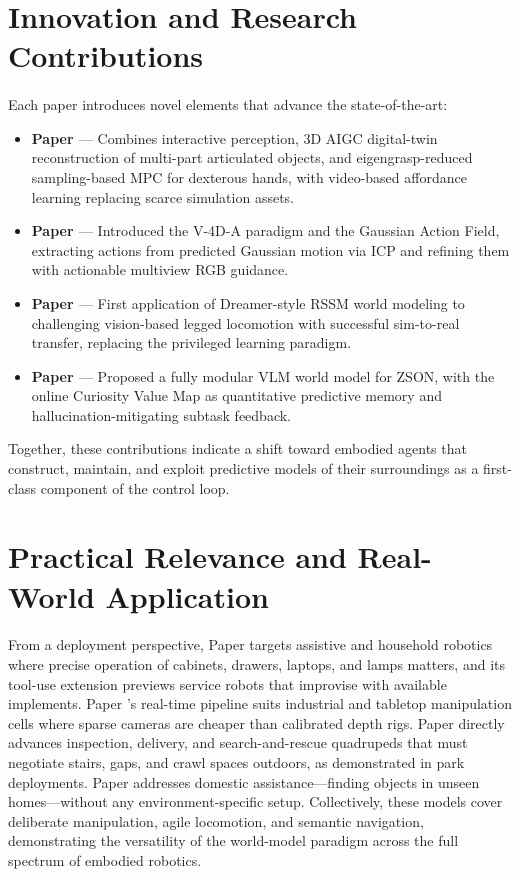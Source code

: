 \documentclass[12pt,a4paper,final]{extreport}
\begin{document}
\section{Innovation and Research Contributions}

\paragraph{} Each paper introduces novel elements that advance the state-of-the-art:
\begin{itemize}
  \item \textbf{Paper \cite{p1}} --- Combines interactive perception, 3D AIGC digital-twin reconstruction of multi-part articulated objects, and eigengrasp-reduced sampling-based MPC for dexterous hands, with video-based affordance learning replacing scarce simulation assets.
  \item \textbf{Paper \cite{p2}} --- Introduced the V-4D-A paradigm and the Gaussian Action Field, extracting actions from predicted Gaussian motion via ICP and refining them with actionable multiview RGB guidance.
  \item \textbf{Paper \cite{p3}} --- First application of Dreamer-style RSSM world modeling to challenging vision-based legged locomotion with successful sim-to-real transfer, replacing the privileged learning paradigm.
  \item \textbf{Paper \cite{p4}} --- Proposed a fully modular VLM world model for ZSON, with the online Curiosity Value Map as quantitative predictive memory and hallucination-mitigating subtask feedback.
\end{itemize}
Together, these contributions indicate a shift toward embodied agents that construct, maintain, and exploit predictive models of their surroundings as a first-class component of the control loop.

\section{Practical Relevance and Real-World Application}

\paragraph{} From a deployment perspective, Paper \cite{p1} targets assistive and household robotics where precise operation of cabinets, drawers, laptops, and lamps matters, and its tool-use extension previews service robots that improvise with available implements. Paper \cite{p2}'s real-time pipeline suits industrial and tabletop manipulation cells where sparse cameras are cheaper than calibrated depth rigs. Paper \cite{p3} directly advances inspection, delivery, and search-and-rescue quadrupeds that must negotiate stairs, gaps, and crawl spaces outdoors, as demonstrated in park deployments. Paper \cite{p4} addresses domestic assistance---finding objects in unseen homes---without any environment-specific setup. Collectively, these models cover deliberate manipulation, agile locomotion, and semantic navigation, demonstrating the versatility of the world-model paradigm across the full spectrum of embodied robotics.
\end{document}
